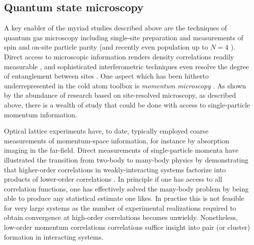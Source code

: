 	
	
	
\subsection{Quantum state microscopy}

	A key enabler of the myriad studies described above are the techniques of quantum gas microscopy \cite{Bakr09,Cheuk15,Endres11,Haller15,Miranda15,Parsons15,Rispoli19,Sherson10,Miranda17,Preiss15a} including single-site preparation and measurements of spin and on-site particle parity (and recently even population up to $N=4$ \cite{Preiss15a}).
	Direct access to microscopic information renders density correlations readily measurable \cite{Endres11,Rispoli19}, and sophisticated interferometric techniques even resolve the degree of entanglement between sites \cite{Brydges19,Daley12,Mouraalves04,Palmer05}.
	One aspect which has been hitherto underrepresented in the cold atom toolbox is \emph{momentum microscopy} \cite{Ott16}.
	As shown by the abundance of research based on site-resolved microscopy, as described above, there is a wealth of study that could be done with access to single-particle momentum information.
	

	Optical lattice experiments have, to date, typically employed coarse measurements of momentum-space information, for instance by absorption imaging in the far-field.
	Direct measurements of single-particle momenta have illustrated the transition from two-body to many-body physics by demonstrating that higher-order correlations in weakly-interacting systems factorize into products of lower-order correlations \cite{Schweigler17,Hodgman17}.
	In principle if one has access to all correlation functions, one has effectively solved the many-body problem by being able to produce any statistical estimate one likes.
	In practise this is not feasible for very large systems as the number of experimental realizations required to obtain convergence at high-order correlations becomes unwieldy.
	Nonetheless, low-order momentum correlations correlations suffice  insight into pair (or cluster) formation in interacting systems.


